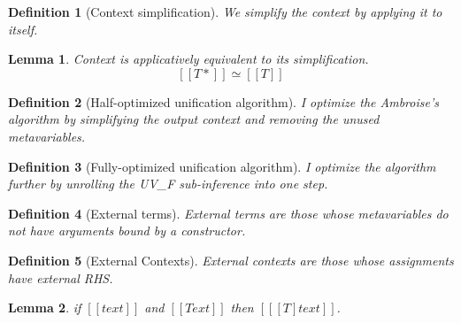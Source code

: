 \documentclass[a4,natbib=false]{article}
\newtheorem{definition}{Definition}
\newtheorem{lemma}{Lemma}
\begin{document}
\begin{definition}[Context simplification]
  We simplify the context by applying it to itself.

  \ottfundefnsimpl{}
\end{definition}

\begin{lemma}
  Context is applicatively equivalent to its simplification.
  \[ [[ T* ]] \simeq [[ T ]] \]
\end{lemma}

\begin{definition}[Half-optimized unification algorithm]
  \label{def:half}
  I optimize the Ambroise's algorithm by simplifying the output context and
  removing the unused metavariables.

  \ottdefnun{}
\end{definition}

\begin{definition}[Fully-optimized unification algorithm]
  \label{def:full}
  I optimize the algorithm further by unrolling the UV\_F sub-inference into one step. 

  \ottdefnaunTwo{}
\end{definition}


\begin{definition}[External terms]
  External terms are those whose metavariables do not have arguments bound by a
  constructor.

  \ottdefnaext{}
\end{definition}

\begin{definition}[External Contexts]
  External contexts are those whose assignments have external RHS. 
  
  \ottdefnaextC{}
\end{definition}

\begin{lemma}
  \label{lemma:ext-app}
  if $ [[ t ext ]] $ and $ [[ T ext ]] $ then $ [[ [T]t ext ]] $.
\end{lemma}
\end{document}
